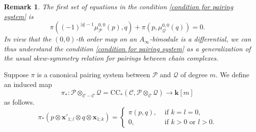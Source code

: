 \documentclass[11pt]{amsproc}
\def\K{{\mathbf{k}}}
\def\cP{\mathcal{P}}
\def\cQ{\mathcal{Q}}
\def\cc{\mathcal{C}}
\def\r#1{\mathrm{#1}}
\def\ainf{A_\infty}
\newtheorem{rem}[lem]{Remark}
\theoremstyle{remark}
\numberwithin{equation}{section}
\begin{document}
 \begin{rem}\label{rem: sign for pairing system}
 The first set of equations in the condition \eqref{condition for pairing system} is 
 \begin{equation}\label{condition for pairing system 0}
 \pi((-1)^{|q| - 1} \mu_{\cP}^{0, 0}(p), q) + \pi(p, \mu_{\cQ}^{0, 0}(q)) = 0.
 \end{equation}
 In view that the $(0, 0)$-th order map on an $\ainf$-bimodule is a differential,
 we can thus understand the condition \eqref{condition for pairing system} as a generalization of the usual skew-symmetry relation for pairings between chain complexes.
 \end{rem}
 
 Suppose $\pi$ is a canonical pairing system between $\cP$ and $\cQ$ of degree $m$.
We define an induced map
\begin{equation}\label{pairing induced map}
\pi_{*}: \cP \otimes_{\cc-\cc} \cQ = \r{CC}_{*}(\cc, \cP \otimes_{\cc} \cQ) \to \K[m]
\end{equation}
as follows.
\begin{equation}\label{pairing induced map formula}
\pi_{*}(p \otimes \mathbf{x}'_{1;l} \otimes q \otimes \mathbf{x}_{1; k})=
\begin{cases}
\pi(p, q), & \text{ if } k=l=0, \\
0, & \text{ if } k>0 \text{ or } l > 0.
\end{cases}
\end{equation}
\end{document}
